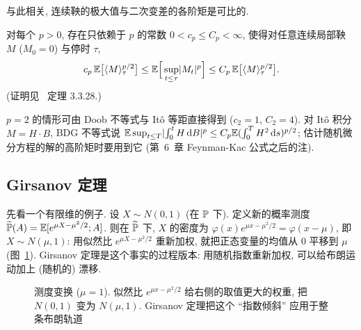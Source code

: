 与此相关, 连续鞅的极大值与二次变差的各阶矩是可比的.

\begin{theorem}\label{thm:bdg}
对每个 $p>0$, 存在只依赖于 $p$ 的常数 $0<c_p\le C_p<\infty$, 使得对任意连续局部鞅 $M$ ($M_0=0$) 与停时 $\tau$,
\[
c_p\,\E\big[\ip{M}_\tau^{p/2}\big]\le\E\Big[\sup_{t\le\tau}\abs{M_t}^p\Big]\le C_p\,\E\big[\ip{M}_\tau^{p/2}\big].
\]
(证明见~\cite{karatzas} 定理 3.3.28.)
\end{theorem}

$p=2$ 的情形可由 Doob 不等式与 It\^o 等距直接得到 ($c_2=1$, $C_2=4$). 对 It\^o 积分 $M=H\cdot B$, BDG 不等式说 $\E\sup_{t\le T}\abs{\int_0^tH\dd B}^p\le C_p\E(\int_0^TH^2\dd s)^{p/2}$; 估计随机微分方程的解的高阶矩时要用到它 (第~6~章 Feynman-Kac 公式之后的注).

\subsection{Girsanov 定理}

先看一个有限维的例子. 设 $X\sim N(0,1)$ (在 $\P$ 下). 定义新的概率测度 $\widetilde{\P}(A)=\E[e^{\mu X-\mu^2/2};A]$. 则在 $\widetilde{\P}$ 下, $X$ 的密度为 $\varphi(x)e^{\mu x-\mu^2/2}=\varphi(x-\mu)$, 即 $X\sim N(\mu,1)$: 用似然比 $e^{\mu X-\mu^2/2}$ 重新加权, 就把正态变量的均值从 $0$ 平移到 $\mu$ (图~\ref{fig:girsanov}). Girsanov 定理是这个事实的过程版本: 用随机指数重新加权, 可以给布朗运动加上 (随机的) 漂移.

\begin{figure}[htbp]
\centering
{}
\caption{测度变换 ($\mu=1$). 似然比 $e^{\mu x-\mu^2/2}$ 给右侧的取值更大的权重, 把 $N(0,1)$ 变为 $N(\mu,1)$. Girsanov 定理把这个 ``指数倾斜'' 应用于整条布朗轨道}
\label{fig:girsanov}
\end{figure}

